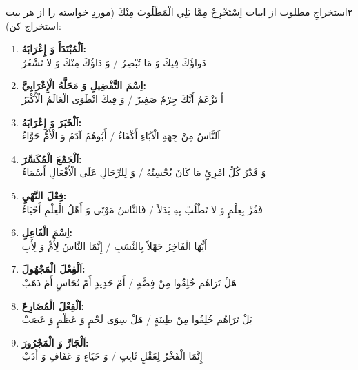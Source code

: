 \begin{JTamrin}{٢}{استخراجِ مطلوب از ابیات}
اِسْتَخْرِجْ مِمَّا يَلِي الْمَطْلُوبَ مِنْكَ (موردِ خواسته را از هر بیت
استخراج کن):

\begin{enumerate}
  \item \textbf{اَلْمُبْتَدَأَ وَ إِعْرَابَهُ:}\\
        دَواؤُكَ فِيكَ وَ مَا تُبْصِرُ / وَ دَاؤُكَ مِنْكَ وَ لا تَشْعُرُ
  \item \textbf{اِسْمَ التَّفْضِيلِ وَ مَحَلَّهُ الْإِعْرَابِيَّ:}\\
        أَ تَزْعَمُ أَنَّكَ جِرْمٌ صَغِيرٌ / وَ فِيكَ انْطَوَى الْعَالَمُ
        الْأَكْبَرُ
  \item \textbf{اَلْخَبَرَ وَ إِعْرَابَهُ:}\\
        اَلنَّاسُ مِنْ جِهَةِ الْآبَاءِ أَكْفَاءُ / أَبُوهُمُ آدَمُ وَ الْأُمُّ
        حَوَّاءُ
  \item \textbf{اَلْجَمْعَ الْمُكَسَّرَ:}\\
        وَ قَدْرُ كُلِّ امْرِئٍ مَا كَانَ يُحْسِنُهُ / وَ لِلرِّجَالِ عَلَى
        الْأَفْعَالِ أَسْمَاءُ
  \item \textbf{فِعْلَ النَّهْيِ:}\\
        فَفُزْ بِعِلْمٍ وَ لا تَطْلُبْ بِهِ بَدَلاً / فَالنَّاسُ مَوْتَى وَ
        أَهْلُ الْعِلْمِ أَحْيَاءُ
  \item \textbf{اِسْمَ الْفَاعِلِ:}\\
        أَيُّهَا الْفَاخِرُ جَهْلاً بِالنَّسَبِ / إِنَّمَا النَّاسُ لِأُمٍّ وَ
        لِأَبِ
  \item \textbf{اَلْفِعْلَ الْمَجْهُولَ:}\\
        هَلْ تَرَاهُم خُلِقُوا مِنْ فِضَّةٍ / أَمْ حَدِيدٍ أَمْ نُحَاسٍ أَمْ
        ذَهَبْ
  \item \textbf{اَلْفِعْلَ الْمُضَارِعَ:}\\
        بَلْ تَرَاهُم خُلِقُوا مِنْ طِينَةٍ / هَلْ سِوَى لَحْمٍ وَ عَظْمٍ وَ
        عَصَبْ
  \item \textbf{اَلْجَارَّ وَ الْمَجْرُورَ:}\\
        إِنَّمَا الْفَخْرُ لِعَقْلٍ ثَابِتٍ / وَ حَيَاءٍ وَ عَفَافٍ وَ أَدَبْ
\end{enumerate}
\end{JTamrin}

